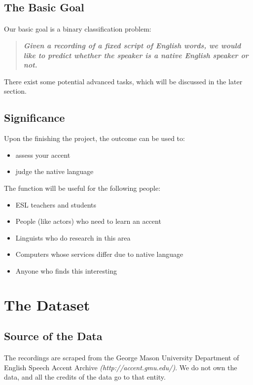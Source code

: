 \subsection{The Basic Goal}
\paragraph{}
Our basic goal is a binary classification problem:
\begin{quote}\textbf{\emph{
	Given a recording of a fixed script of English words, we would like to predict whether the speaker is a native English speaker or not.}}
\end{quote}

There exist some potential advanced tasks, which will be discussed in the later section.


\subsection{Significance}
Upon the finishing the project, the outcome can be used to:
\begin{itemize}
	\item assess your accent
	\item judge the native language
\end{itemize}
The function will be useful for the following people:
\begin{itemize}
	\item ESL teachers and students
	\item People (like actors) who need to learn an accent
	\item Linguists who do research in this area
	\item Computers whose services differ due to native language
	\item Anyone who finds this interesting
\end{itemize}



\newpage


\section{The Dataset}
\subsection{Source of the Data}
\paragraph{}
The recordings are scraped from the George Mason University Department of English Speech Accent Archive \emph{(http://accent.gmu.edu/)}. We do not own the data, and all the credits of the data go to that entity.
